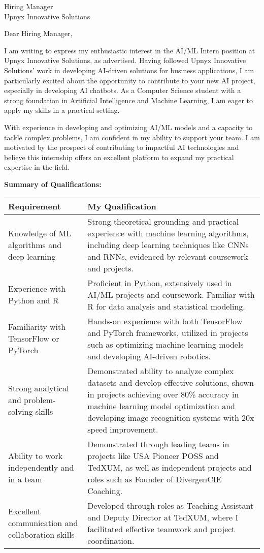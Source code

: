 \documentclass[10.5pt]{letter}
\date{\today}
\begin{document}
\begin{letter}{Hiring Manager\\Upnyx Innovative Solutions}

\opening{Dear Hiring Manager,}

I am writing to express my enthusiastic interest in the AI/ML Intern position at Upnyx Innovative Solutions, as advertised.  Having followed Upnyx Innovative Solutions' work in developing AI-driven solutions for business applications, I am particularly excited about the opportunity to contribute to your new AI project, especially in developing AI chatbots. As a Computer Science student with a strong foundation in Artificial Intelligence and Machine Learning, I am eager to apply my skills in a practical setting.

With experience in developing and optimizing AI/ML models and a capacity to tackle complex problems, I am confident in my ability to support your team. I am motivated by the prospect of contributing to impactful AI technologies and believe this internship offers an excellent platform to expand my practical expertise in the field.

\vspace{0.3cm}
\textbf{Summary of Qualifications:}
\vspace{0.2cm}

\renewcommand{\arraystretch}{1.3}
\begin{tabularx}{\textwidth}{@{}p{}X@{}}
\textbf{Requirement} & \textbf{My Qualification} \\
\hline
Knowledge of ML algorithms and deep learning & Strong theoretical grounding and practical experience with machine learning algorithms, including deep learning techniques like CNNs and RNNs, evidenced by relevant coursework and projects. \\
Experience with Python and R & Proficient in Python, extensively used in AI/ML projects and coursework. Familiar with R for data analysis and statistical modeling. \\
Familiarity with TensorFlow or PyTorch & Hands-on experience with both TensorFlow and PyTorch frameworks, utilized in projects such as optimizing machine learning models and developing AI-driven robotics. \\
Strong analytical and problem-solving skills & Demonstrated ability to analyze complex datasets and develop effective solutions, shown in projects achieving over 80\% accuracy in machine learning model optimization and developing image recognition systems with 20x speed improvement. \\
Ability to work independently and in a team & Demonstrated through leading teams in projects like USA Pioneer POSS and TedXUM, as well as independent projects and roles such as Founder of DivergenCIE Coaching. \\
Excellent communication and collaboration skills & Developed through roles as Teaching Assistant and Deputy Director at TedXUM, where I facilitated effective teamwork and project coordination. \\
\end{tabularx}


\end{letter}
\end{document}
